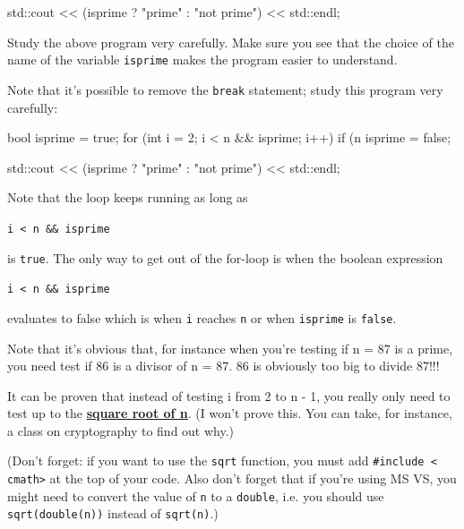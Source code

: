 \begin{console}
\begin{console}
std::cout << (isprime ? "prime" : "not prime")
          << std::endl;
\end{console}
Study the above program very carefully. Make sure you see that the
choice of the name of the variable \texttt{isprime} makes the program
easier to understand.

Note that it's possible to remove the \texttt{break}
statement; study this program very carefully:
\begin{console}
bool isprime = true;
for (int i = 2; i < n && isprime; i++)
{   
    if (n %
    {
        isprime = false;
    }
}

std::cout << (isprime ? "prime" : "not prime")
          << std::endl;
\end{console}

Note that the loop keeps running as long as
\begin{center}
\texttt{i < n \&\& isprime}
\end{center}
is \texttt{true}. The only way to get out of the for-loop is when the
boolean expression
\begin{center}
\texttt{i < n \&\& isprime}
\end{center}
evaluates to false which is when \texttt{i} reaches \texttt{n} or when
\texttt{isprime} is \texttt{false}.

Note that it's obvious that, for instance when
you're testing if n = 87 is a prime, you need
 test if 86 is a divisor of n = 87. 86 is obviously too big
to divide 87!!!

It can be proven that instead of testing i from 2 to n - 1, you really only need to test up to the \underline{\textbf{square root of n}}. (I won't prove this. You can take, for instance, a class on cryptography to find out why.)
(Don't forget: if you want to use the \texttt{sqrt} function, you must add \texttt{\#include < cmath>} at the top of your code. Also don't forget that if you're using MS VS, you might need to convert the value of \texttt{n} to a \texttt{double}, i.e. you should use \texttt{sqrt(double(n))} instead of \texttt{sqrt(n)}.)


\end{console}
